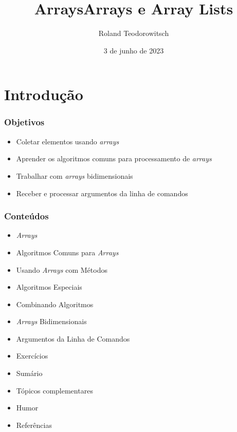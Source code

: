 \documentclass[xcolor={dvipsnames,table},aspectratio=169]{beamer}
\title[\sc{Arrays}]{Arrays}
\title[\sc{Arrays e Array Lists}]{Arrays e Array Lists}
\author[Roland Teodorowitsch]{Roland Teodorowitsch}
\institute[FPROG - EP - PUCRS]{Fundamentos de Programação - Escola Politécnica - PUCRS}
\date{3 de junho de 2023}
\begin{document}
\justifying

\begin{frame}
	\titlepage
\end{frame}

\section{Introdução}

\begin{frame}\frametitle{Objetivos}
\begin{itemize}
	\item Coletar elementos usando \emph{arrays}
	\item Aprender os algoritmos comuns para processamento de \emph{arrays}
	\item Trabalhar com \emph{arrays} bidimensionais
	\item Receber e processar argumentos da linha de comandos
\end{itemize}
\end{frame}

\begin{frame}\frametitle{Conteúdos}
\begin{itemize}
	\item \emph{Arrays}
	\item Algoritmos Comuns para \emph{Arrays}
	\item Usando \emph{Arrays} com Métodos
	\item Algoritmos Especiais
	\item Combinando Algoritmos
	\item \emph{Arrays} Bidimensionais
	\item Argumentos da Linha de Comandos
	\item Exercícios
	\item Sumário
	\item Tópicos complementares
	\item Humor
	\item Referências
\end{itemize}
\end{frame}
\end{document}

